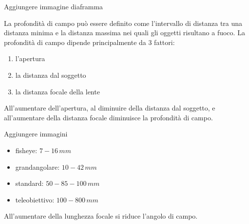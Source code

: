 \documentclass[letterpaper,10pt,italian]{jupyterBook}
\begin{document}
\sphinxAtStartPar
{} Aggiungere immagine diaframma

\sphinxAtStartPar
{} La profondità di campo può essere definito come l’intervallo di distanza tra una distanza minima e la distanza massima nei quali gli oggetti risultano a fuoco. La profondità di campo dipende principalmente da 3 fattori:
\begin{enumerate}
%
\item {} 
\sphinxAtStartPar
l’apertura

\item {} 
\sphinxAtStartPar
la distanza dal soggetto

\item {} 
\sphinxAtStartPar
la distanza focale della lente

\end{enumerate}

\sphinxAtStartPar
All’aumentare dell’apertura, al diminuire della distanza dal soggetto, e all’aumentare della distanza focale diminuisce la profondità di campo.

\sphinxAtStartPar
{} Aggiungere immagini

\sphinxAtStartPar
{}
\begin{itemize}
\item {} 
\sphinxAtStartPar
fisheye: \(7-16 \, mm\)

\item {} 
\sphinxAtStartPar
grandangolare: \(10-42 \, mm\)

\item {} 
\sphinxAtStartPar
standard: \(50-85-100 \, mm\)

\item {} 
\sphinxAtStartPar
teleobiettivo: \(100-800 \, mm\)

\end{itemize}

\sphinxAtStartPar
{} All’aumentare della lunghezza focale si riduce l’angolo di campo.
\end{document}
